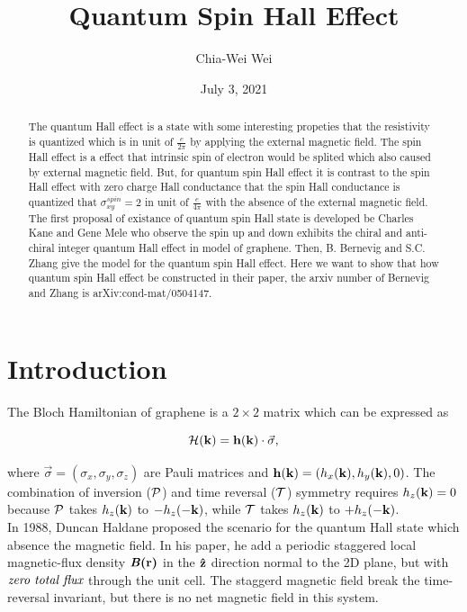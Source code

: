 \documentclass[12pt,a4paper]{article}
\title{Quantum Spin Hall Effect}
\author{Chia-Wei Wei}
\date{July 3, 2021}
\begin{document}
\maketitle

\begin{abstract}

The quantum Hall effect is a state with some interesting propeties that the
resistivity is quantized which is in unit of $\frac{e}{2\pi} $ by applying 
the external magnetic field. The spin Hall effect is a effect that 
intrinsic spin of electron would be splited which also caused by external 
magnetic field. But, for quantum spin Hall effect
it is contrast to the 
spin Hall effect with zero charge Hall conductance that the spin Hall 
conductance is quantized that $\sigma^{spin}_{xy}=2$ in unit of  
$\frac{e}{4\pi}$ with the absence of the external magnetic field.
The first proposal of existance of quantum spin Hall
state\cite{PhysRevLett.95.226801} is developed be
Charles Kane and Gene Mele who observe the spin up and down exhibits the 
chiral and  anti-chiral integer quantum Hall effect in model of graphene. 
Then, B. Bernevig and S.C. Zhang\cite{PhysRevLett.96.106802} give the model 
for the quantum spin Hall 
effect. Here we want to show that how quantum spin Hall effect be constructed 
in their paper, the arxiv number of Bernevig and Zhang is 
arXiv:cond-mat/0504147.

\end{abstract}


\section*{Introduction}%
\label{sec:introduction}
\indent
The Bloch Hamiltonian of graphene is a $2\times 2$ matrix which can be
expressed as 

\begin{equation*}
	    {\cal H}({\bf k}) = {\bf h}({\bf k}) \cdot \vec \sigma,
	    \label{dirac}
\end{equation*}

\noindent
where $\vec\sigma = (\sigma_{x},\sigma_{y},\sigma_{z})$ are Pauli matrices
and ${\bf h}({\bf k}) = (h_x({\bf k}),h_y({\bf k}),0)$.  The
combination of inversion ($\cal P$) and time reversal ($\cal T$) symmetry 
requires $h_z({\bf k})=0$ because $\cal P$ takes $h_z({\bf k})$ to 
$-h_z(-{\bf k})$, while $\cal T$ takes $h_z({\bf k})$ to $+h_z(-{\bf
k})$.\\  

In 1988, Duncan Haldane\cite{PhysRevLett.61.2015} proposed the scenario 
for the quantum Hall state
which absence the magnetic field. In his paper, he add a periodic staggered 
local magnetic-flux density $\textbf{\emph{B}(r)}$ in the ${\bf \hat{z}}$
direction normal to the 2D plane, but with $\emph{zero total flux}$ through
the unit cell. The staggerd magnetic field break the time-reversal invariant,
but there is no net magnetic field in this system. 
\end{document}
